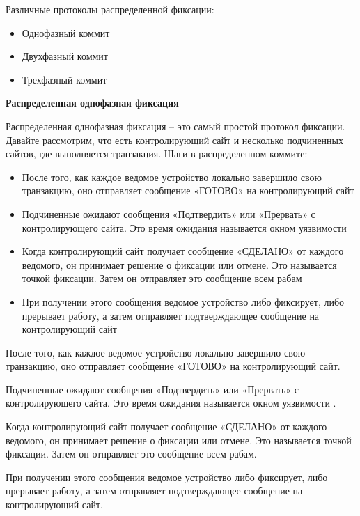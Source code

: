 Различные протоколы распределенной фиксации:
\begin{itemize}
    \item Однофазный коммит
    \item Двухфазный коммит
    \item Трехфазный коммит
\end{itemize}

\bigbreak
\textbf{Распределенная однофазная фиксация}

Распределенная однофазная фиксация – это самый простой протокол фиксации. Давайте рассмотрим, что есть контролирующий сайт и несколько подчиненных сайтов, где выполняется транзакция. Шаги в распределенном коммите:
\begin{itemize}
    \item После того, как каждое ведомое устройство локально завершило свою транзакцию, оно отправляет сообщение «ГОТОВО» на контролирующий сайт
    \item Подчиненные ожидают сообщения «Подтвердить» или «Прервать» с контролирующего сайта. Это время ожидания называется окном уязвимости
    \item Когда контролирующий сайт получает сообщение «СДЕЛАНО» от каждого ведомого, он принимает решение о фиксации или отмене. Это называется точкой фиксации. Затем он отправляет это сообщение всем рабам
    \item При получении этого сообщения ведомое устройство либо фиксирует, либо прерывает работу, а затем отправляет подтверждающее сообщение на контролирующий сайт
\end{itemize}

После того, как каждое ведомое устройство локально завершило свою транзакцию, оно отправляет сообщение «ГОТОВО» на контролирующий сайт.

Подчиненные ожидают сообщения «Подтвердить» или «Прервать» с контролирующего сайта. Это время ожидания называется окном уязвимости .

Когда контролирующий сайт получает сообщение «СДЕЛАНО» от каждого ведомого, он принимает решение о фиксации или отмене. Это называется точкой фиксации. Затем он отправляет это сообщение всем рабам.

При получении этого сообщения ведомое устройство либо фиксирует, либо прерывает работу, а затем отправляет подтверждающее сообщение на контролирующий сайт.

